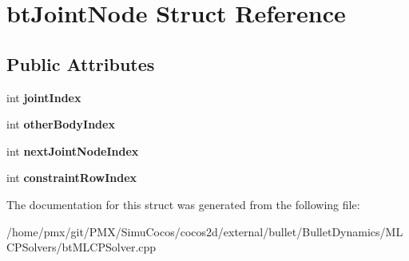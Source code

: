 \hypertarget{structbtJointNode}{}\section{bt\+Joint\+Node Struct Reference}
\label{structbtJointNode}
\subsection*{Public Attributes}
\begin{DoxyCompactItemize}
\item 
\mbox{\label{structbtJointNode_a4d7a67a0f2ebb2ab55a8191c64bb6ae2}} 
int {\bfseries joint\+Index}
\item 
\mbox{\label{structbtJointNode_aea089efa0de09dd98abb0153f2524b35}} 
int {\bfseries other\+Body\+Index}
\item 
\mbox{\label{structbtJointNode_a1c050343ce885c74a420229ea6f0d066}} 
int {\bfseries next\+Joint\+Node\+Index}
\item 
\mbox{\label{structbtJointNode_a3fb9ebc744005c5788a250eb17d813c3}} 
int {\bfseries constraint\+Row\+Index}
\end{DoxyCompactItemize}


The documentation for this struct was generated from the following file\+:\begin{DoxyCompactItemize}
\item 
/home/pmx/git/\+P\+M\+X/\+Simu\+Cocos/cocos2d/external/bullet/\+Bullet\+Dynamics/\+M\+L\+C\+P\+Solvers/bt\+M\+L\+C\+P\+Solver.\+cpp\end{DoxyCompactItemize}
